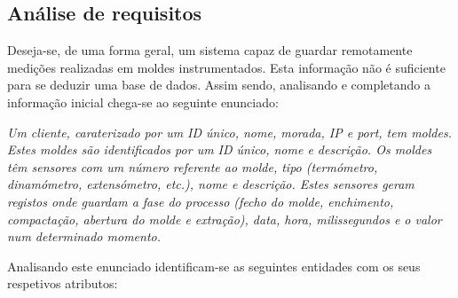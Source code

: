 \documentclass[11pt,twoside,a4paper]{report}
\begin{document}
\subsection{Análise de requisitos}
\label{subchap:analise}
Deseja-se, de uma forma geral, um sistema capaz de guardar remotamente medições realizadas em moldes instrumentados. Esta informação não é suficiente para se deduzir uma base de dados. Assim sendo, analisando e completando a informação inicial chega-se ao seguinte enunciado:\par 
\newpage
\textit{Um cliente, caraterizado por um ID único, nome, morada, IP e port, tem moldes. Estes moldes são identificados por um ID único, nome e descrição. Os moldes têm sensores com um número referente ao molde, tipo (termómetro, dinamómetro, extensómetro, etc.), nome e descrição. Estes sensores geram registos onde guardam a fase do processo (fecho do molde, enchimento, compactação, abertura do molde e extração), data, hora, milissegundos e o valor num determinado momento.}\par 
\vspace{2ex}
Analisando este enunciado identificam-se as seguintes entidades com os seus respetivos atributos:
\end{document}
